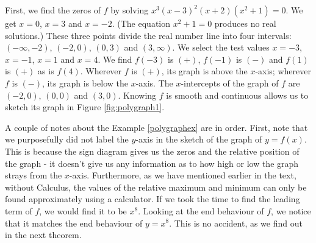 \medskip 

{
First, we find the zeros of $f$ by solving $x^3 (x-3)^2 (x+2)\left(x^2+1\right)=0$.   We get $x=0$, $x=3$ and $x=-2$. (The equation $x^2+1=0$ produces no real solutions.)  These three points divide the real number line into four intervals:  $(-\infty, -2)$, $(-2,0)$, $(0,3)$ and $(3,\infty)$.  We select the test values $x=-3$, $x=-1$, $x=1$ and $x=4$. We find $f(-3)$ is $(+)$, $f(-1)$ is $(-)$ and $f(1)$ is $(+)$ as is $f(4)$.  Wherever $f$ is $(+)$, its graph is above the $x$-axis;  wherever $f$ is $(-)$, its graph is below the $x$-axis.  The $x$-intercepts of the graph of $f$ are $(-2,0)$, $(0,0)$ and $(3,0)$.  Knowing $f$ is smooth and continuous allows us to sketch its graph in Figure \ref{fig:polygraph1}.


}

\medskip

A couple of notes about the Example \ref{polygraphex} are in order.  First, note that we purposefully did not label the $y$-axis in the sketch of the graph of $y=f(x)$.  This is because the sign diagram gives us the zeros and the relative position of the graph - it doesn't give us any information as to how high or low the graph strays from the $x$-axis.  Furthermore, as we have mentioned earlier in the text, without Calculus, the values of the relative maximum and minimum can only be found approximately using a calculator.  If we took the time to find the leading term of $f$, we would find it to be $x^8$.  Looking at the end behaviour of $f$, we notice that it matches the end behaviour of $y=x^8$.  This is no accident, as we find out in the next theorem.

\smallskip


